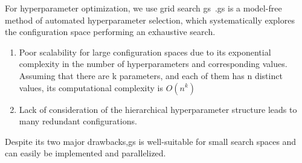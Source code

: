 For hyperparameter optimization, we use grid search \ac{gs}~\cite{Lorenzo2017,Yang2020,Zoeller2021}.\Ac{gs} is a model-free method of automated hyperparameter selection, which systematically explores the configuration space performing an exhaustive search.
\begin{enumerate}
    \item Poor scalability for large configuration spaces due to its exponential complexity in the number of hyperparameters and corresponding values. Assuming that there are k parameters, and each of them has n distinct values, its computational complexity is $O(n^{k})$
    \item Lack of consideration of the hierarchical hyperparameter structure leads to many redundant configurations.
\end{enumerate}
Despite its two major drawbacks,\ac{gs} is well-suitable for small search spaces and can easily be implemented and parallelized.